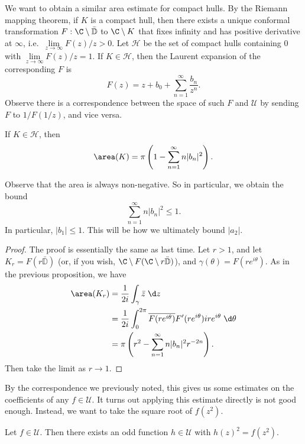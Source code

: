\documentclass[a4paper]{article}
\renewcommand\D{\mathbb{D}}
\begin{document}
We want to obtain a similar area estimate for compact hulls. By the Riemann mapping theorem, if $K$ is a compact hull, then there exists a unique conformal transformation $F: \C \setminus \bar{\D}$ to $\C \setminus K$ that fixes infinity and has positive derivative at $\infty$, i.e.\ $\lim\limits_{z \to \infty} F(z)/z > 0$. Let $\mathcal{H}$ be the set of compact hulls containing $0$ with $\lim\limits_{z\to \infty} F(z)/z = 1$. If $K \in \mathcal{H}$, then the Laurent expansion of the corresponding $F$ is
\[
  F(z) = z + b_0 + \sum_{n = 1}^\infty \frac{b_n}{z^n}.
\]
Observe there is a correspondence between the space of such $F$ and $\mathcal{U}$ by sending $F$ to $1/F(1/z)$, and vice versa.
\begin{prop}
  If $K \in \mathcal{H}$, then
  \[
    \area (K) = \pi \left(1 - \sum_{n = 1}^\infty n|b_n|^2\right).
  \]
\end{prop}
Observe that the area is always non-negative. So in particular, we obtain the bound
\[
  \sum_{n = 1}^\infty n |b_n|^2 \leq 1.
\]
In particular, $|b_1| \leq 1$. This will be how we ultimately bound $|a_2|$.
\begin{proof}
  The proof is essentially the same as last time. Let $r > 1$, and let $K_r = F(r \bar{\D})$ (or, if you wish, $\C \setminus F(\C \setminus r\bar{\D})$), and $\gamma(\theta) = F(r e^{i\theta})$. As in the previous proposition, we have
  \begin{align*}
    \area(K_r) &= \frac{1}{2i} \int_\gamma \bar{z} \;\d z\\
    &= \frac{1}{2i} \int_0^{2\pi} \overline{F(re^{i\theta})}F'(re^{i\theta}) ir e^{i\theta}\;\d \theta\\
    &= \pi \left(r^2 - \sum_{n = 1}^\infty n |b_n|^2 r^{-2n}\right).
  \end{align*}
  Then take the limit as $r \to 1$.
\end{proof}
By the correspondence we previously noted, this gives us some estimates on the coefficients of any $f \in \mathcal{U}$. It turns out applying this estimate directly is not good enough. Instead, we want to take the square root of $f(z^2)$.

\begin{lemma}
  Let $f \in \mathcal{U}$. Then there exists an odd function $h \in \mathcal{U}$ with $h(z)^2 = f(z^2)$.
\end{lemma}
\end{document}
